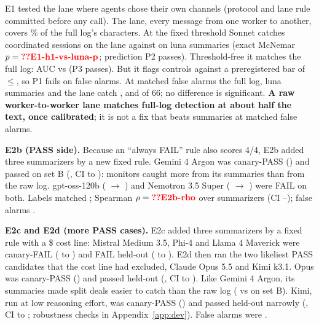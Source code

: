 \documentclass[11pt]{article}
\begin{document}
E1 tested the lane where agents chose their own channels (protocol and lane rule committed before any call). The lane, every message from one worker to another, covers \% of the full log's characters. At the fixed threshold Sonnet catches  coordinated sessions on the lane against  on luna summaries (exact McNemar $p=\N{E1-h1-vs-luna-p}$; prediction P2 passes). Threshold-free it matches the full log: AUC  vs  (P3 passes). But it flags  controls against a preregistered bar of $\leq$, so P1 fails on false alarms. At matched false alarms the full log, luna summaries and the lane catch ,  and  of 66; no difference is significant. \textbf{A raw worker-to-worker lane matches full-log detection at about half the text, once calibrated}; it is not a fix that beats summaries at matched false alarms.

\textbf{E2b (PASS side).} Because an ``always FAIL'' rule also scores 4/4, E2b added three summarizers by a new fixed rule. Gemini 4 Argon was canary-PASS () and passed on set B (, CI  to ): monitors caught more from its summaries than from the raw log. gpt-oss-120b ( $\to$ ) and Nemotron 3.5 Super ( $\to$ ) were FAIL on both. Labels matched ; Spearman $\rho=\N{E2b-rho}$ over  summarizers (CI --); false alarms .

\textbf{E2c and E2d (more PASS cases).} E2c added three summarizers by a fixed rule with a \$ cost line: Mistral Medium 3.5, Phi-4 and Llama 4 Maverick were canary-FAIL ( to ) and FAIL held-out ( to ). E2d then ran the two likeliest PASS candidates that the cost line had excluded, Claude Opus 5.5 and Kimi k3.1. Opus was canary-PASS () and passed held-out (, CI  to ). Like Gemini 4 Argon, its summaries made split deals easier to catch than the raw log ( vs  on set B). Kimi, run at low reasoning effort, was canary-PASS () and passed held-out narrowly (, CI  to ; robustness checks in Appendix~\ref{app:dev}). False alarms were .
\end{document}
